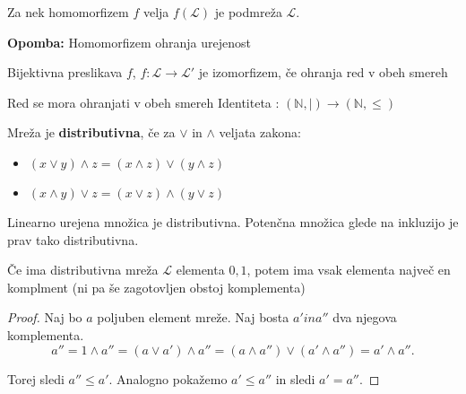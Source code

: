 \documentclass[slovene]{beamer}
\newenvironment{remark}
{\textbf{Opomba:}}
{}
\begin{document}
\begin{frame}
\begin{theorem}
Za nek homomorfizem $f$ velja $f(\mathcal{L})$ je podmreža $\mathcal{L}$.
\end{theorem}

\begin{remark}
Homomorfizem ohranja urejenost
\end{remark}
\end{frame}


\begin{frame}

\begin{theorem}
Bijektivna preslikava $f$, $f : \mathcal{L} \to \mathcal{L}'$ je izomorfizem, če ohranja red v obeh smereh
\end{theorem}

\begin{block}{Red se mora ohranjati v obeh smereh}
Identiteta : $(\mathbb{N}, |)  \to (\mathbb{N}, \leq) $
\end{block}
\end{frame}

\begin{frame}
\begin{definition}
Mreža je \textbf{distributivna}, če za $\lor$ in $\land$ veljata zakona:
\begin{itemize}
\item $(x \lor y) \land z = (x \land z) \lor (y \land z)$
\item $(x \land y) \lor z = (x \lor z) \land (y \lor z)$
\end{itemize}
\end{definition}


\begin{example}
Linearno urejena množica je distributivna.
Potenčna množica glede na inkluzijo je prav tako distributivna.
\end{example}

\end{frame}

\begin{frame}
\begin{theorem}
Če ima distributivna mreža $\mathcal{L}$ elementa $0,1$, potem ima vsak elementa največ en komplment (ni pa še zagotovljen obstoj komplementa)
\end{theorem}

\begin{proof}
Naj bo $a$ poljuben element mreže. Naj bosta $a' in a''$ dva njegova komplementa.\\
$$ a'' = 1 \land a'' = (a \lor a') \land a'' = (a  \land a'') \lor (a' \land a'') =  a' \land a''. $$

Torej sledi $ a'' \leq a'$. Analogno pokažemo $a' \leq a''$ in sledi $ a' = a''.$

\end{proof}

\end{frame}
\end{document}
